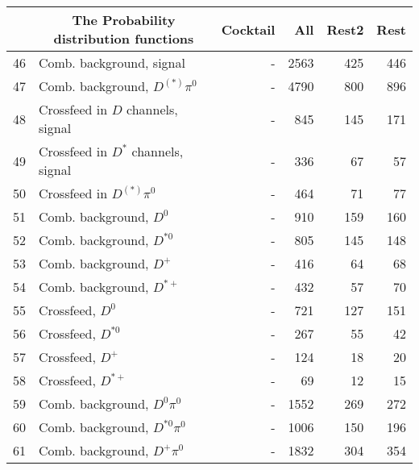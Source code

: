 \documentclass[6pt]{article}
\begin{document}
\begin{tabular}{r l r r r r}\\ \hline\hline
     & \multicolumn{1}{c}{\bf The Probability distribution functions}  &  Cocktail & All & Rest2 & Rest  \\ \hline
46   & Comb. background, signal                               &  -            & 2563    & 425     & 446       \\
47   & Comb. background, $D^{(*)}\pi^0$                       &  -            & 4790    & 800     & 896       \\
48   & Crossfeed in $D$ channels, signal                      &  -            & 845     & 145     & 171       \\
49   & Crossfeed in $D^*$ channels, signal                    &  -            & 336     & 67      & 57        \\
50   & Crossfeed in $D^{(*)}\pi^0$                            &  -            & 464     & 71      & 77        \\ \hline               
51   & Comb. background, $D^{0} $                             &  -            & 910     & 159     & 160    \\
52   & Comb. background, $D^{*0} $                            &  -            & 805     & 145     & 148    \\
53   & Comb. background, $D^{+} $                             &  -            & 416     & 64      & 68     \\
54   & Comb. background, $D^{*+} $                            &  -            & 432     & 57      & 70     \\
55   & Crossfeed, $D^{0} $                                    &  -            & 721     & 127     & 151    \\
56   & Crossfeed, $D^{*0} $                                   &  -            & 267     & 55      & 42     \\
57   & Crossfeed, $D^{+} $                                    &  -            & 124     & 18      & 20     \\
58   & Crossfeed, $D^{*+} $                                   &  -            & 69      & 12      & 15     \\
59   & Comb. background, $D^{0} \pi^0$                        &  -            & 1552    & 269     & 272    \\
60   & Comb. background, $D^{*0} \pi^0$                       &  -            & 1006    & 150     & 196    \\
61   & Comb. background, $D^{+} \pi^0$                        &  -            & 1832    & 304     & 354    \\

\end{tabular}
\end{document}
